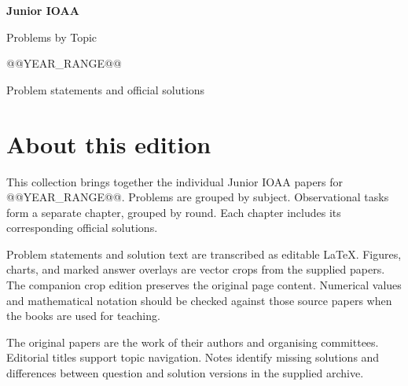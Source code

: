 \documentclass[11pt,a4paper,twoside,openany]{book}
\begin{document}
\frontmatter
\begin{titlepage}
  \centering
  \vspace*{30mm}
  {\Huge\bfseries Junior IOAA\par}
  \vspace{6mm}
  {\LARGE Problems by Topic\par}
  \vspace{8mm}
  {\Large @@YEAR_RANGE@@\par}
  \vfill
  {\large Problem statements and official solutions\par}
  \vspace{10mm}
\end{titlepage}
\chapter*{About this edition}
This collection brings together the individual Junior IOAA papers for
@@YEAR_RANGE@@. Problems are grouped by subject. Observational tasks form a
separate chapter, grouped by round. Each chapter includes its corresponding
official solutions.

Problem statements and solution text are transcribed as editable \LaTeX.
Figures, charts, and marked answer overlays are vector crops from the supplied
papers. The companion crop edition preserves the original page content.
Numerical values and mathematical notation should be checked against those
source papers when the books are used for teaching.

The original papers are the work of their authors and organising committees.
Editorial titles support topic navigation. Notes identify missing solutions
and differences between question and solution versions in the supplied archive.

\tableofcontents
\mainmatter

\backmatter

\end{document}
